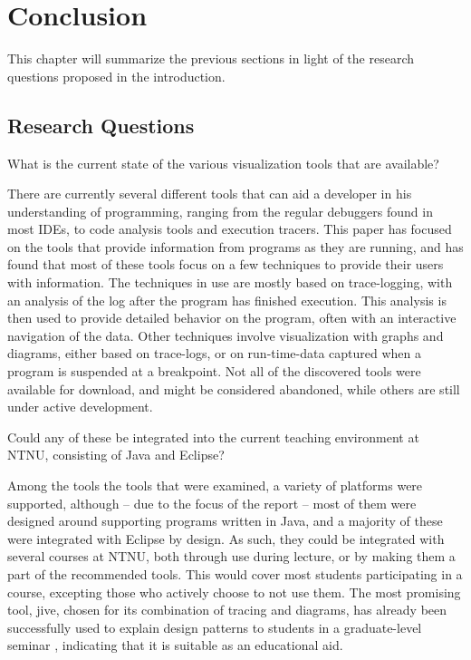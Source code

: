 \chapter{Conclusion}\label{conclusion}

This chapter will summarize the previous sections in light of the research questions proposed in the introduction.

\section{Research Questions}\label{conclusionRQs}


\begin{theorem}
What is the current state of the various visualization tools that are available?
\end{theorem}

There are currently several different tools that can aid a developer in his understanding of programming, ranging from the regular debuggers found in most IDEs, to code analysis tools and execution tracers.
This paper has focused on the tools that provide information from programs as they are running, and has found that most of these tools focus on a few techniques to provide their users with information.
The techniques in use are mostly based on trace-logging, with an analysis of the log after the program has finished execution.
This analysis is then used to provide detailed behavior on the program, often with an interactive navigation of the data.
Other techniques involve visualization with graphs and diagrams, either based on trace-logs, or on run-time-data captured when a program is suspended at a breakpoint.
Not all of the discovered tools were available for download, and might be considered abandoned, while others are still under active development.


\begin{theorem}
Could any of these be integrated into the current teaching environment at NTNU, consisting of Java and Eclipse?
\end{theorem}

Among the tools the tools that were examined, a variety of platforms were supported, although -- due to the focus of the report -- most of them were designed around supporting programs written in Java, and a majority of these were integrated with Eclipse by design.
As such, they could be integrated with several courses at NTNU, both through use during lecture, or by making them a part of the recommended tools.
This would cover most students participating in a course, excepting those who actively choose to not use them.
The most promising tool, \gls{jive}, chosen for its combination of tracing and diagrams, has already been successfully used to explain design patterns to students in a graduate-level seminar \cite[p. 99]{Gestwicki2005}, indicating that it is suitable as an educational aid.


